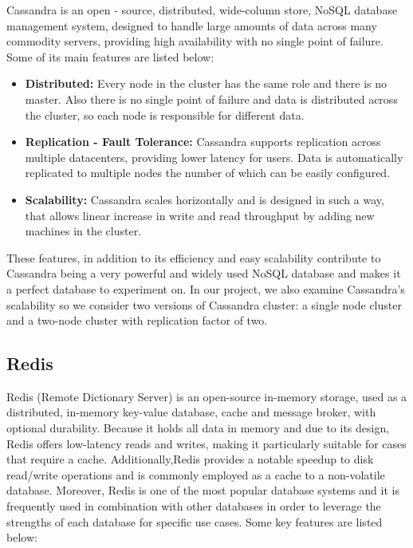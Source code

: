 \documentclass[conference]{IEEEtran}
\begin{document}
Cassandra is an open - source, distributed, wide-column store, NoSQL database management system, designed to handle large amounts of data across many commodity servers,
providing high availability with no single point of failure. Some of its main features are listed below:

\begin{itemize}
    \item \textbf{Distributed:} Every node in the cluster has the same role and there is no master. Also there is no single point of failure and data is distributed across the cluster, so 
    each node is responsible for different data.
    \item \textbf{Replication - Fault Tolerance:} Cassandra supports replication across multiple datacenters, providing lower latency for users. Data is automatically replicated to multiple nodes the number
    of which can be easily configured.
    \item \textbf{Scalability:} Cassandra scales horizontally and is designed in such a way, that allows linear increase in write and read throughput by adding new machines in the cluster.
\end{itemize}

These features, in addition to its efficiency and easy scalability contribute to Cassandra being a very powerful and widely used NoSQL database and makes it a perfect database to experiment on. 
In our project, we also examine Cassandra's scalability so we consider two versions of Cassandra cluster: a single node cluster and a two-node cluster with replication factor of two.

\subsection{Redis}

Redis (Remote Dictionary Server) is an open-source in-memory storage, used as a distributed, in-memory key-value database, cache and message broker, with optional durability. Because it holds all
data in memory and due to its design, Redis offers low-latency reads and writes, making it particularly suitable for cases that require a cache. Additionally,Redis provides a notable speedup to disk
read/write operations and is commonly employed as a cache to a non-volatile database. Moreover, Redis is one of the most popular database systems and
it is frequently used in combination with other databases in order to leverage the strengths of each database for specific use cases. Some key features are listed below:
\end{document}

